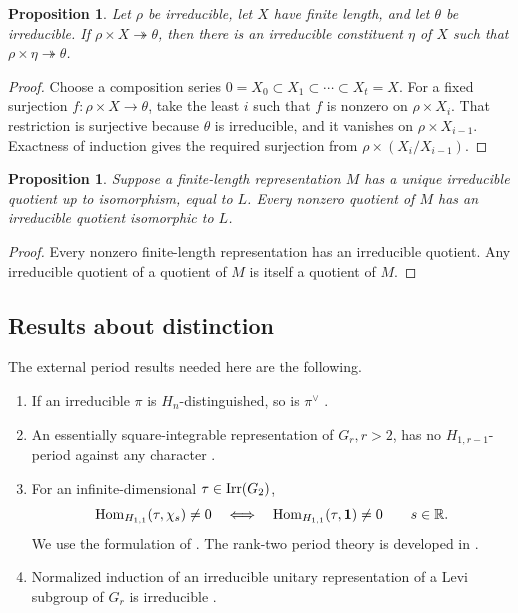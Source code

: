 \documentclass[11pt,leqno]{amsart}
\numberwithin{equation}{section}
\theoremstyle{plain}
\newtheorem{proposition}[theorem]{Proposition}
\theoremstyle{definition}
\theoremstyle{remark}
\newcommand{\one}{\mathbf{1}}
\newcommand{\onto}{\twoheadrightarrow}
\begin{document}
	\begin{proposition}\label{lem:tail}
		Let $\rho$ be irreducible, let $X$ have finite length, and let $\theta$ be irreducible. 
		If $\rho\times X\onto\theta$, then there is an irreducible constituent $\eta$ of $X$ such that $\rho\times\eta\onto\theta$.
	\end{proposition}
	\begin{proof}
		Choose a composition series $0=X_0\subset X_1\subset\cdots\subset X_t=X$.
		For a fixed surjection $f:\rho\times X\to\theta$, take the least $i$ such that $f$ is nonzero on $\rho\times X_i$.
		That restriction is surjective because $\theta$ is irreducible, and it vanishes on $\rho\times X_{i-1}$.
		Exactness of induction gives the required surjection from $\rho\times(X_i/X_{i-1})$.
	\end{proof}
	
	
	\begin{proposition}\label{lem:head}
		Suppose a finite-length representation $M$ has a unique irreducible quotient up to isomorphism, equal to $L$.
		Every nonzero quotient of $M$ has an irreducible quotient isomorphic to $L$.   
	\end{proposition}
	\begin{proof}
		Every nonzero finite-length representation has an irreducible quotient.
		Any irreducible quotient of a quotient of $M$ is itself a quotient of $M$.
	\end{proof}
	
	
	
	\subsection{Results about distinction}
	The external period results needed here are the following.
	\begin{enumerate}[label=(P\arabic*)]
		\item\label{item:contra}
		If an irreducible $\pi$ is $H_n$-distinguished, so is $\pi^\vee$ \cite[Lemma 2.6]{DSV}.
		\item\label{item:DSvan}
		An essentially square-integrable representation of $G_r, r>2$, has no $H_{1,r-1}$-period against any character \cite[Theorem 3.8]{ALMSY24}.
		\item\label{item:ranktwo}
		For an infinite-dimensional $\tau\in {\rm Irr}(G_2)$,
		\begin{equation}\label{eq:rank-two}
			{\rm Hom}_{H_{1,1}}(\tau,\chi_s)\ne0 \quad\Longleftrightarrow\quad
			{\rm Hom}_{H_{1,1}}(\tau,\one)\ne0 \qquad s\in\mathbb R.
		\end{equation}
		We use the formulation of \cite[Remark 3.1]{DSV}. The rank-two period theory is developed in \cite{Raghuram,GanTakeda}.
		\item\label{item:unitary}
		Normalized induction of an irreducible unitary representation of a Levi subgroup of $G_r$ is irreducible \cite{Secherre}.
	\end{enumerate}
	
\end{document}
